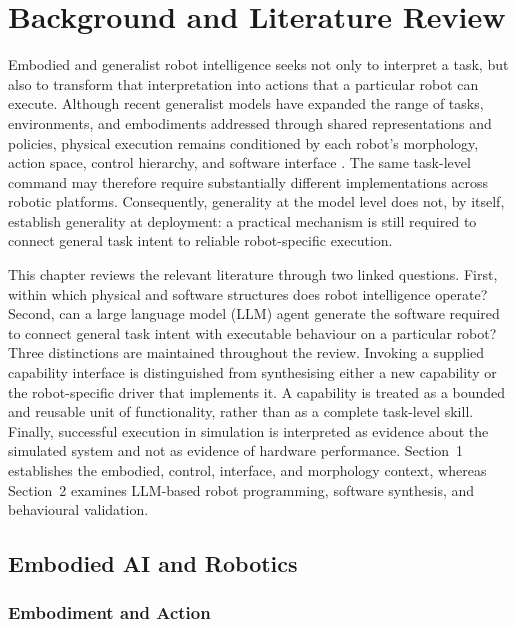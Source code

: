 \chapter[Background and Literature Review]{Background and Literature Review}
\label{chapter:background}

Embodied and generalist robot intelligence seeks not only to interpret a task,
but also to transform that interpretation into actions that a particular robot
can execute. Although recent generalist models have expanded the range of
tasks, environments, and embodiments addressed through shared representations
and policies, physical execution remains conditioned by each robot's
morphology, action space, control hierarchy, and software interface
\citep{brooks1991intelligence,brohan2022rt1,openxembodiment2024}. The same
task-level command may therefore require substantially different
implementations across robotic platforms. Consequently, generality at the
model level does not, by itself, establish generality at deployment: a
practical mechanism is still required to connect general task intent to
reliable robot-specific execution.

This chapter reviews the relevant literature through two linked questions.
First, within which physical and software structures does robot intelligence
operate? Second, can a large language model (LLM) agent generate the software
required to connect general task intent with executable behaviour on a
particular robot? Three distinctions are maintained throughout the review.
Invoking a supplied capability interface is distinguished from synthesising
either a new capability or the robot-specific driver that implements it. A
capability is treated as a bounded and reusable unit of functionality, rather
than as a complete task-level skill. Finally, successful execution in
simulation is interpreted as evidence about the simulated system and not as
evidence of hardware performance. Section~1 establishes the embodied,
control, interface, and morphology context, whereas Section~2 examines
LLM-based robot programming, software synthesis, and behavioural validation.

\section{Embodied AI and Robotics}
\label{sec:embodied-ai-robotics}

\subsection{Embodiment and Action}
\label{sec:embodiment-action}

